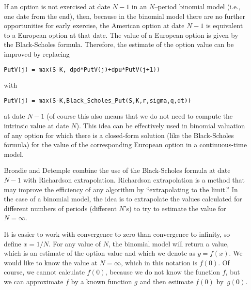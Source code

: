 If an option is not exercised at date $N-1$ in an $N$--period binomial model (i.e., one date from the end), then, because in the binomial model there are no further opportunities for early exercise, the American option at date $N-1$ is equivalent to a European option at that date.  The value of a European option is given by the Black-Scholes formula.  Therefore, the estimate of the option value can be improved by replacing
\small\begin{verbatim}
PutV(j) = max(S-K, dpd*PutV(j)+dpu*PutV(j+1))
\end{verbatim}\normalsize
with
\small\begin{verbatim}
PutV(j) = max(S-K,Black_Scholes_Put(S,K,r,sigma,q,dt))
\end{verbatim}\normalsize
at date $N-1$ (of course this also means that we do not need to compute the intrinsic value at date $N$).
This idea can be effectively used in binomial valuation of any option for which there is a closed-form solution (like the Black-Scholes formula) for the value of the corresponding European option in a continuous-time model.

Broadie and Detemple combine the use of the Black-Scholes formula at date $N-1$ with  Richardson extrapolation.  Richardson extrapolation is a method that may improve the efficiency of any algorithm by ``extrapolating to the limit.''  In the case of a binomial model, the idea is to extrapolate the values calculated for different numbers of periods (different $N$'s) to try to estimate the value for $N=\infty$.  

It is easier to work with convergence to zero than convergence to infinity, so define $x=1/N$.  For any value of $N$, the binomial model will return a value, which is an estimate of the option value and which we denote as $y=f(x)$.  We would like to know the value at $N=\infty$, which in this notation is $f(0)$.  Of course, we cannot calculate $f(0)$, because we do not know the function $f$, but we can approximate $f$ by a known function $g$ and then estimate $f(0)$ by~$g(0)$.

